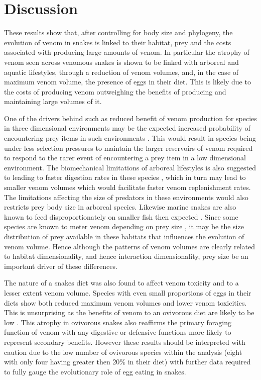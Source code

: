 \section{Discussion}


These results show that, after controlling for body size and phylogeny, the evolution of venom in snakes is linked to their habitat, prey and the costs associated with producing large amounts of venom. In particular the atrophy of venom seen across venomous snakes is shown to be linked with arboreal and aquatic lifestyles, through a reduction of venom volumes,  and, in the case of maximum venom volume, the presence of eggs in their diet. This is likely due to the costs of producing venom \citep{pintor2010costs} outweighing the benefits of producing and maintaining large volumes of it. 


One of the drivers behind such as reduced benefit of venom production for species in three dimensional environments may be the expected increased probability of encountering prey items in such environments \citep{pawar2012dimensionality}. This would result in species being under less selection pressures to maintain the larger reservoirs of venom required to respond to the rarer event of encountering a prey item in a low dimensional environment. The biomechanical limitations of arboreal lifestyles is also suggested to leading to faster digestion rates in these species \citep{lillywhite2002patterns}, which in turn may lead to smaller venom volumes which would facilitate faster venom replenishment rates. The limitations affecting the size of predators in these environments would also restricts prey body size in arboreal species. Likewise marine snakes are also known to feed disproportionately on smaller fish then expected \citep{voris1981size}. Since some species are known to meter venom depending on prey size \citep{hayes1995venom}, it may be the size distribution of prey available in these habitats that influences the evolution of venom volume. Hence although the patterns of venom volumes are clearly related to habitat dimensionality, and hence interaction dimensionality, prey size be an important driver of these differences. %


The nature of a snakes diet was also found to affect venom toxicity and to a lesser extent venom volume. Species with even small proportions of eggs in their diets show both reduced maximum venom volumes and lower venom toxicities. This is unsurprising as the benefits of venom to an ovivorous diet are likely to be low \citep{li2005eggs}. This atrophy in ovivorous snakes also reaffirms the primary foraging function of venom with any digestive \citep{rodriguez1992venom} or defensive functions \citep{jansa2011adaptive} more likely to represent secondary benefits. However these results should be interpreted with caution due to the low number of ovivorous species within the analysis (eight with only four having greater then 20\% in their diet) with further data required to fully gauge the evolutionary role of egg eating in snakes. 


